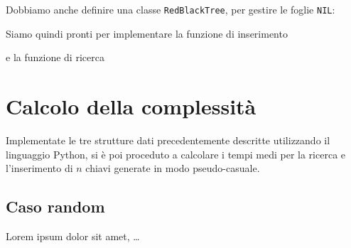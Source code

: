 \documentclass[11pt,a4paper,italian]{article}
\begin{document}
Dobbiamo anche definire una classe \texttt{RedBlackTree}, per gestire le foglie \texttt{NIL}:


Siamo quindi pronti per implementare la funzione di inserimento

e la funzione di ricerca




\section{Calcolo della complessità}
Implementate le tre strutture dati precedentemente descritte utilizzando il linguaggio Python, si è poi proceduto a calcolare i tempi medi per la ricerca e l'inserimento di $n$ chiavi generate in modo pseudo-casuale.

\subsection{Caso random}
Lorem ipsum dolor sit amet, \dots
\end{document}
